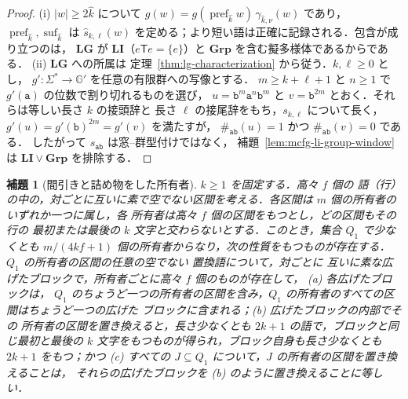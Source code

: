 \documentclass[11pt,a4paper]{ltjsarticle}
\numberwithin{equation}{section}
\theoremstyle{plain}
\newtheorem{lemma}[theorem]{補題}
\theoremstyle{definition}
\theoremstyle{remark}
\theoremstyle{plain}
\begin{document}
\begin{proof}
(i) $|w|\ge2\hat k$ について $g(w)=g(\operatorname{pref}_{\hat k}w)\,\gamma_{\hat k,\nu}(w)$ であり，
$\operatorname{pref}_{\hat k},\operatorname{suf}_{\hat k}$ は
$\widehat s_{k,\ell}(w)$ を定める；より短い語は正確に記録される．包含が成り立つのは，
$\mathbf{LG}$ が $\mathbf{LI}$（$e\mathsf Te=\{e\}$）と
$\mathbf{Grp}$ を含む擬多様体であるからである．
(ii) $\mathbf{LG}$ への所属は
定理~\ref{thm:lg-characterization} から従う．$k,\ell\ge0$ とし，
$g':\Sigma^*\to {\mathbb G}'$ を任意の有限群への写像とする．
$m\ge k+\ell+1$ と $n\ge1$ で $g'(\mathtt a)$ の位数で割り切れるものを選び，
$u=\mathtt b^m\mathtt a^{n}\mathtt b^m$ と
$v=\mathtt b^{2m}$ とおく．それらは等しい長さ $k$ の接頭辞と
長さ $\ell$ の接尾辞をもち，$s_{k,\ell}$ について長く，
$g'(u)=g'(\mathtt b)^{2m}=g'(v)$ を満たすが，
$\#_{\mathtt{ab}}(u)=1$ かつ $\#_{\mathtt{ab}}(v)=0$ である．
したがって $s_{\mathtt{ab}}$ は窓--群型付けではなく，
補題~\ref{lem:mcfg-li-group-window} は
$\mathbf{LI}\vee\mathbf{Grp}$ を排除する．
\end{proof}

\begin{lemma}[間引きと詰め物をした所有者]
\label{lem:lg-buffered-owners}
$k\ge1$ を固定する．高々 $f$ 個の
語（\emph{行}）の中の，対ごとに互いに素で空でない区間を考える．各区間は $m$ 個の所有者のいずれか一つに属し，各
所有者は高々 $f$ 個の区間をもつとし，どの区間もその行の
最初または最後の $k$ 文字と交わらないとする．このとき，集合 $Q_1$ で少なくとも
$m/(4kf+1)$ 個の所有者からなり，次の性質をもつものが存在する．$Q_1$ の所有者の区間の任意の空でない
置換語について，対ごとに
互いに素な\emph{広げたブロック}で，所有者ごとに高々 $f$ 個のものが存在して，
\textup{(a)} 各広げたブロックは，
$Q_1$ のちょうど一つの所有者の区間を含み，$Q_1$ の所有者のすべての区間はちょうど一つの広げた
ブロックに含まれる；\textup{(b)} 広げたブロックの内部でその
所有者の区間を置き換えると，長さ少なくとも $2k+1$ の語で，ブロックと同じ最初と最後の
$k$ 文字をもつものが得られ，ブロック自身も長さ少なくとも $2k+1$ をもつ；かつ
\textup{(c)} すべての $J\subseteq Q_1$ について，$J$ の所有者の区間を置き換えることは，
それらの広げたブロックを \textup{(b)} のように置き換えることに等しい．
\end{lemma}
\end{document}
